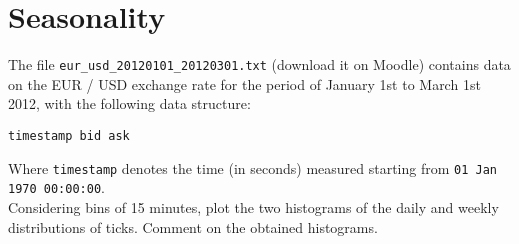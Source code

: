 \section{Seasonality}

The file \texttt{eur\_usd\_20120101\_20120301.txt} (download it on Moodle) contains data on the EUR / USD exchange rate for the period of January 1st to March 1st 2012, with the following data structure:
\begin{verbatim}
timestamp bid ask
\end{verbatim}

\noindent Where \texttt{timestamp} denotes the time (in seconds) measured starting from \texttt{01 Jan 1970 00:00:00}. \\

\noindent Considering bins of 15 minutes, plot the two histograms of the daily and weekly distributions of ticks. Comment on the obtained histograms.

